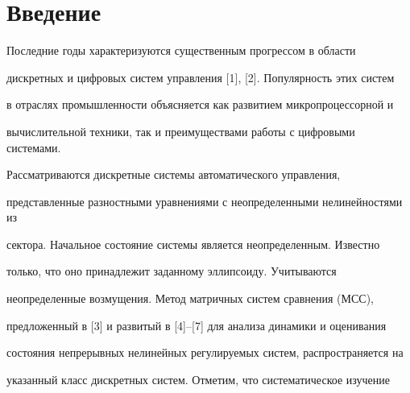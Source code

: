 \date{}




\pagestyle{plain} %







\maketitle


\label{begin}











\section*{Введение}





Последние годы характеризуются существенным прогрессом в области


дискретных и цифровых систем управления [1], [2]. Популярность этих систем


в отраслях промышленности объясняется как развитием микропроцессорной и


вычислительной техники, так и преимуществами работы с цифровыми системами.





Рассматриваются дискретные системы автоматического управления,


представленные разностными уравнениями с неопределенными нелинейностями из


сектора. Начальное состояние системы является неопределенным. Известно


только, что оно принадлежит заданному эллипсоиду. Учитываются


неопределенные возмущения. Метод матричных систем сравнения (МСС),


предложенный в [3] и развитый в [4]--[7] для анализа динамики и оценивания


состояния непрерывных нелинейных регулируемых систем, распространяется на


указанный класс дискретных систем. Отметим, что систематическое изучение


